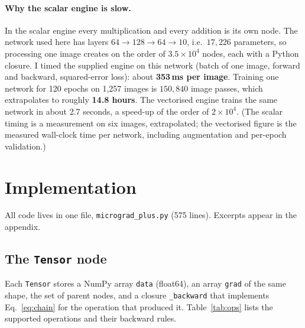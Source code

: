 \documentclass[11pt,a4paper]{article}
\newcommand{\code}[1]{\texttt{#1}}
\begin{document}
\paragraph{Why the scalar engine is slow.} In the scalar engine every multiplication and every addition is its own node. The network used here has layers $64\to128\to64\to10$, i.e.\ $17{,}226$ parameters, so processing one image creates on the order of $3.5\times10^{4}$ nodes, each with a Python closure. I timed the supplied engine on this network (batch of one image, forward and backward, squared-error loss): about \textbf{353\,ms per image}. Training one network for 120 epochs on 1{,}257 images is $150{,}840$ image passes, which extrapolates to roughly \textbf{14.8 hours}. The vectorised engine trains the same network in about 2.7 seconds, a speed-up of the order of $2\times10^{4}$. (The scalar timing is a measurement on six images, extrapolated; the vectorised figure is the measured wall-clock time per network, including augmentation and per-epoch validation.)

\section{Implementation}
All code lives in one file, \code{micrograd\_plus.py} (575 lines). Excerpts appear in the appendix.

\subsection{The \code{Tensor} node}
Each \code{Tensor} stores a NumPy array \code{data} (float64), an array \code{grad} of the same shape, the set of parent nodes, and a closure \code{\_backward} that implements Eq.~\eqref{eq:chain} for the operation that produced it. Table~\ref{tab:ops} lists the supported operations and their backward rules.
\end{document}
